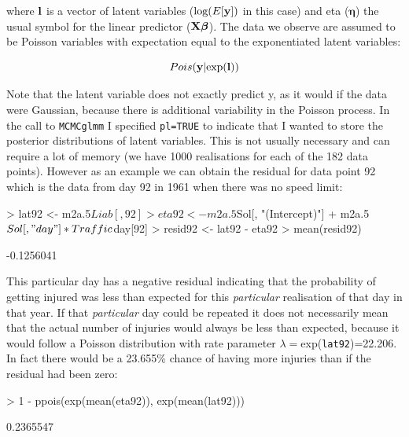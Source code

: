 \documentclass{article}
\begin{document}
where ${\bf l}$ is a vector of latent variables ($\textrm{log}(E[{\bf y}])$ in this case) and eta (${\bm \eta}$) the usual symbol for the linear predictor (${\bf X}{\bm \beta}$). The data we observe are assumed to be Poisson variables with expectation equal to the exponentiated latent variables: 

\begin{equation}
Pois({\bf y} | \textrm{exp}({\bf l}))
\end{equation}


Note that the latent variable does not exactly predict y, as it would if the data were Gaussian, because there is additional variability in the Poisson process. In the call to \texttt{MCMCglmm} I specified \texttt{pl=TRUE} to indicate that I wanted to store the posterior distributions of latent variables. This is not usually necessary and can require a lot of memory (we have 1000 realisations for each of the 182 data points). However as an example we can obtain the residual for data point 92 which is the data from day 92 in 1961 when there was no speed limit:

\begin{Schunk}
\begin{Sinput}
> lat92 <- m2a.5$Liab[, 92]
> eta92 <- m2a.5$Sol[, "(Intercept)"] + m2a.5$Sol[, "day"] * Traffic$day[92]
> resid92 <- lat92 - eta92
> mean(resid92)
\end{Sinput}
\begin{Soutput}
[1] -0.1256041
\end{Soutput}
\end{Schunk}

This particular day has a negative residual indicating that the probability of getting injured was less than expected for this \emph{particular} realisation of that day in that year. If that \emph{particular} day could be repeated it does not necessarily mean that the actual number of injuries would always be less than expected, because it would follow a Poisson distribution with rate parameter $\lambda=$exp(\texttt{lat92})=22.206. In fact there would be a 23.655\% chance of having more injuries than if the residual had been zero:

\begin{Schunk}
\begin{Sinput}
> 1 - ppois(exp(mean(eta92)), exp(mean(lat92)))
\end{Sinput}
\begin{Soutput}
[1] 0.2365547
\end{Soutput}
\end{Schunk}
\end{document}
